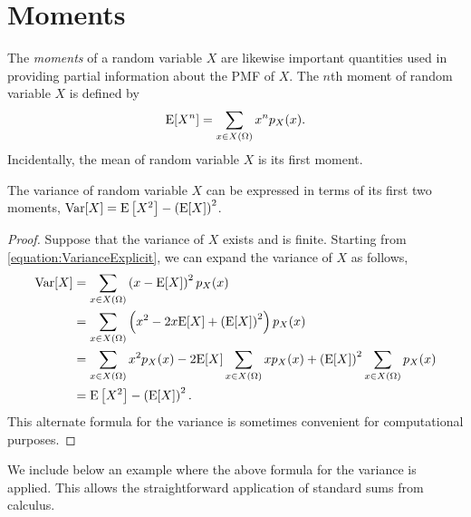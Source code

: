 \section{Moments}

The \emph{moments} of a random variable $X$ are likewise important quantities used in providing partial information about the PMF of $X$. 
The $n$th moment of random variable $X$ is defined by
\begin{equation} \label{equation:DiscreteMoments}
\mathrm{E} [X^n] = \sum_{x \in X(\Omega)} x^n p_X (x) .
\end{equation}
Incidentally, the mean of random variable $X$ is its first moment.

\begin{proposition}
The variance of random variable $X$ can be expressed in terms of its first two moments,
$\mathrm{Var} [X] = \mathrm{E} \left[ X^2 \right] - \left( \mathrm{E} [X] \right)^2$.
\end{proposition}
\begin{proof}
Suppose that the variance of $X$ exists and is finite.
Starting from \eqref{equation:VarianceExplicit}, we can expand the variance of $X$ as follows,
\begin{equation*}
\begin{split}
\mathrm{Var} [X] &= \sum_{x \in X(\Omega)} \left( x - \mathrm{E} [X] \right)^2 p_X (x) \\
&= \sum_{x \in X(\Omega)} \left( x^2 - 2 x \mathrm{E} [X] + \left( \mathrm{E} [X] \right)^2 \right) p_X (x) \\
&= \sum_{x \in X(\Omega)} x^2 p_X (x) - 2 \mathrm{E} [X] \sum_{x \in X(\Omega)} x p_X (x) + \left( \mathrm{E} [X] \right)^2 \sum_{x \in X(\Omega)} p_X (x) \\
&= \mathrm{E} \left[ X^2 \right] - \left( \mathrm{E} [X] \right)^2.
\end{split}
\end{equation*}
This alternate formula for the variance is sometimes convenient for computational purposes.
\end{proof}

We include below an example where the above formula for the variance is applied.
This allows the straightforward application of standard sums from calculus.

